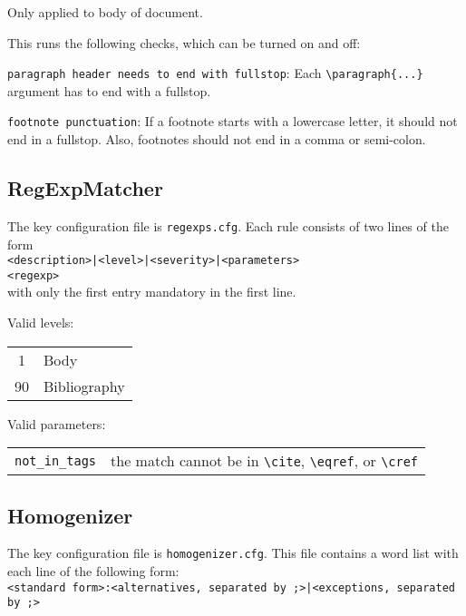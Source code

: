 \documentclass[11pt]{article}
\begin{document}
    Only applied to body of document.
    
    This runs the following checks, which can be turned on and off:
    
    \verb+paragraph header needs to end with fullstop+: Each \verb+\paragraph{...}+ argument has to end with a fullstop.
    
    \verb+footnote punctuation+: If a footnote starts with a lowercase letter, it should not end in a fullstop. Also, footnotes should not end in a comma or semi-colon.
    
    \subsection{RegExpMatcher}

    The key configuration file is \verb+regexps.cfg+. Each rule consists of two lines of the form\\    
    \verb+<description>|<level>|<severity>|<parameters>+\\    
    \verb+<regexp>+\\
    with only the first entry mandatory in the first line. 
    
    Valid levels:\\
    \hspace*{2cm}\begin{tabular}{cl}
     1 & Body\\
     90 & Bibliography
    \end{tabular}
    
    Valid parameters:\\
    \hspace*{2cm}\begin{tabular}{ll}
    \verb+not_in_tags+ & the match cannot be in \verb+\cite+, \verb+\eqref+, or \verb+\cref+
    \end{tabular}
    
    \subsection{Homogenizer}

    The key configuration file is \verb+homogenizer.cfg+. This file contains a word list with each line of the following form:\\
    \verb+<standard form>:<alternatives, separated by ;>|<exceptions, separated by ;>+
    
\end{document}
